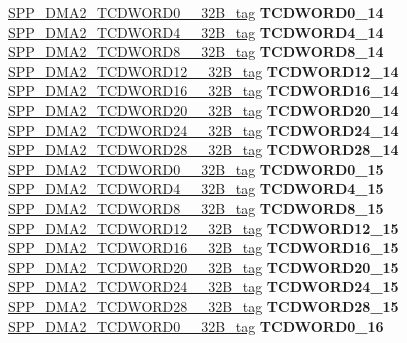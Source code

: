\begin{DoxyCompactItemize}
\begin{tabbing}
\>\>\mbox{\hyperlink{unionSPP__DMA2__TCDWORD0____32B__tag}{SPP\_DMA2\_TCDWORD0\_\_32B\_tag}} {\bfseries TCDWORD0\_14}\\
\>\>\mbox{\hyperlink{unionSPP__DMA2__TCDWORD4____32B__tag}{SPP\_DMA2\_TCDWORD4\_\_32B\_tag}} {\bfseries TCDWORD4\_14}\\
\>\>\mbox{\hyperlink{unionSPP__DMA2__TCDWORD8____32B__tag}{SPP\_DMA2\_TCDWORD8\_\_32B\_tag}} {\bfseries TCDWORD8\_14}\\
\>\>\mbox{\hyperlink{unionSPP__DMA2__TCDWORD12____32B__tag}{SPP\_DMA2\_TCDWORD12\_\_32B\_tag}} {\bfseries TCDWORD12\_14}\\
\>\>\mbox{\hyperlink{unionSPP__DMA2__TCDWORD16____32B__tag}{SPP\_DMA2\_TCDWORD16\_\_32B\_tag}} {\bfseries TCDWORD16\_14}\\
\>\>\mbox{\hyperlink{unionSPP__DMA2__TCDWORD20____32B__tag}{SPP\_DMA2\_TCDWORD20\_\_32B\_tag}} {\bfseries TCDWORD20\_14}\\
\>\>\mbox{\hyperlink{unionSPP__DMA2__TCDWORD24____32B__tag}{SPP\_DMA2\_TCDWORD24\_\_32B\_tag}} {\bfseries TCDWORD24\_14}\\
\>\>\mbox{\hyperlink{unionSPP__DMA2__TCDWORD28____32B__tag}{SPP\_DMA2\_TCDWORD28\_\_32B\_tag}} {\bfseries TCDWORD28\_14}\\
\>\>\mbox{\hyperlink{unionSPP__DMA2__TCDWORD0____32B__tag}{SPP\_DMA2\_TCDWORD0\_\_32B\_tag}} {\bfseries TCDWORD0\_15}\\
\>\>\mbox{\hyperlink{unionSPP__DMA2__TCDWORD4____32B__tag}{SPP\_DMA2\_TCDWORD4\_\_32B\_tag}} {\bfseries TCDWORD4\_15}\\
\>\>\mbox{\hyperlink{unionSPP__DMA2__TCDWORD8____32B__tag}{SPP\_DMA2\_TCDWORD8\_\_32B\_tag}} {\bfseries TCDWORD8\_15}\\
\>\>\mbox{\hyperlink{unionSPP__DMA2__TCDWORD12____32B__tag}{SPP\_DMA2\_TCDWORD12\_\_32B\_tag}} {\bfseries TCDWORD12\_15}\\
\>\>\mbox{\hyperlink{unionSPP__DMA2__TCDWORD16____32B__tag}{SPP\_DMA2\_TCDWORD16\_\_32B\_tag}} {\bfseries TCDWORD16\_15}\\
\>\>\mbox{\hyperlink{unionSPP__DMA2__TCDWORD20____32B__tag}{SPP\_DMA2\_TCDWORD20\_\_32B\_tag}} {\bfseries TCDWORD20\_15}\\
\>\>\mbox{\hyperlink{unionSPP__DMA2__TCDWORD24____32B__tag}{SPP\_DMA2\_TCDWORD24\_\_32B\_tag}} {\bfseries TCDWORD24\_15}\\
\>\>\mbox{\hyperlink{unionSPP__DMA2__TCDWORD28____32B__tag}{SPP\_DMA2\_TCDWORD28\_\_32B\_tag}} {\bfseries TCDWORD28\_15}\\
\>\>\mbox{\hyperlink{unionSPP__DMA2__TCDWORD0____32B__tag}{SPP\_DMA2\_TCDWORD0\_\_32B\_tag}} {\bfseries TCDWORD0\_16}\\

\end{tabbing}
\end{DoxyCompactItemize}
